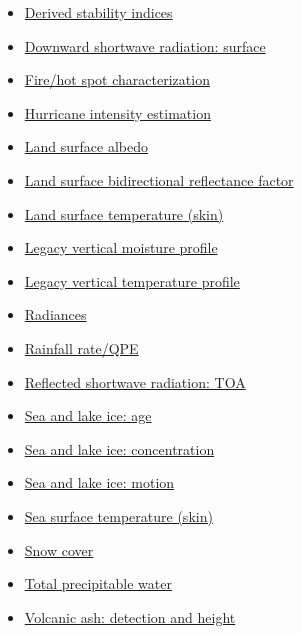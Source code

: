 \begin{itemize}
\item \href{https://www.goes-r.gov/products/baseline-derived-stability-indices.html}{Derived stability indices}
\item \href{https://www.goes-r.gov/products/baseline-DSR.html}{Downward shortwave radiation: surface}
\item \href{https://www.goes-r.gov/products/baseline-fire-hot-spot.html}{Fire/hot spot characterization}
\item \href{https://www.goes-r.gov/products/baseline-hurricane-intensity.html}{Hurricane intensity estimation}
\item \href{https://www.goes-r.gov/products/LSA.html}{Land surface albedo}
\item \href{https://www.goes-r.gov/products/BRF.html}{Land surface bidirectional reflectance factor}
\item \href{https://www.goes-r.gov/products/baseline-LST.html}{Land surface temperature (skin)}
\item \href{https://www.goes-r.gov/products/baseline-legacy-vert-moisture-profile.html}{Legacy vertical moisture profile}
\item \href{https://www.goes-r.gov/products/baseline-legacy-vert-temp-profile.html}{Legacy vertical temperature profile}
\item \href{https://www.goes-r.gov/products/baseline-radiances.html}{Radiances}
\item \href{https://www.goes-r.gov/products/baseline-rainfall-rate-qpe.html}{Rainfall rate/QPE}
\item \href{https://www.goes-r.gov/products/baseline-TOA.html}{Reflected shortwave radiation: TOA}
\item \href{https://www.goes-r.gov/products/opt2-sea-lake-ice-age.html}{Sea and lake ice: age}
\item \href{https://www.goes-r.gov/products/opt2-sea-lake-ice-concentration.html}{Sea and lake ice: concentration}
\item \href{https://www.goes-r.gov/products/opt2-sea-lake-ice-motion.html}{Sea and lake ice: motion}
\item \href{https://www.goes-r.gov/products/baseline-SST.html}{Sea surface temperature (skin)}
\item \href{https://www.goes-r.gov/products/baseline-snow-cover.html}{Snow cover}
\item \href{https://www.goes-r.gov/products/baseline-total-precipitable-water.html}{Total precipitable water}
\item \href{https://www.goes-r.gov/products/baseline-volcanic-ash.html}{Volcanic ash: detection and height}
\end{itemize}


